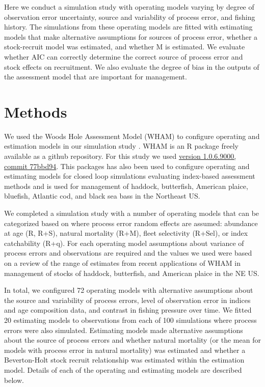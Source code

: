 \documentclass[
  12pt,
]{article}
\begin{document}
Here we conduct a simulation study with operating models varying by
degree of observation error uncertainty, source and variability of
process error, and fishing history. The simulations from these operating
models are fitted with estimating models that make alternative
assumptions for sources of process error, whether a stock-recruit model
was estimated, and whether M is estimated. We evaluate whether AIC can
correctly determine the correct source of process error and stock
effects on recruitment. We also evaluate the degree of bias in the
outputs of the assessment model that are important for management.

\hypertarget{methods}{%
\section*{Methods}\label{methods}}

We used the Woods Hole Assessment Model (WHAM) to configure operating
and estimation models in our simulation study
\citep[]{millerstock20,stockmiller21}. WHAM is an R package freely
available as a github repository. For this study we used
\href{https://github.com/timjmiller/wham/tree/77bbd946e4881216a439933473d1c58b21c270c3}{version
1.0.6.9000, commit 77bbd94}. This packages has also been used to
configure operating and estimating models for closed loop simulations
evaluating index-based assessment methods \citep{legaultetal23} and is
used for management of haddock, butterfish, American plaice, bluefish,
Atlantic cod, and black sea bass in the Northeast US.

We completed a simulation study with a number of operating models that
can be categorized based on where process error random effects are
assumed: abundance at age (R, R+S), natural mortality (R+M), fleet
selectivity (R+Sel), or index catchability (R+q). For each operating
model assumptions about variance of process errors and observations are
required and the values we used were based on a review of the range of
estimates from recent applications of WHAM in management of stocks of
haddock, butterfish, and American plaice in the NE US.

In total, we configured 72 operating models with alternative assumptions
about the source and variability of process errors, level of observation
error in indices and age composition data, and contrast in fishing
pressure over time. We fitted 20 estimating models to observations from
each of 100 simulations where process errors were also simulated.
Estimating models made alternative assumptions about the source of
process errors and whether natural mortality (or the mean for models
with process error in natural mortality) was estimated and whether a
Beverton-Holt stock recruit relationship was estimated within the
estimation model. Details of each of the operating and estimating models
are described below.
\end{document}
